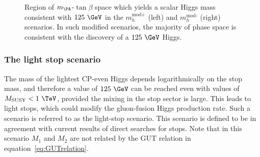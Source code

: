 \begin{figure}[htbp]
\caption{Region of $m_{\PA}$-$\tan\beta$ space which yields a scalar Higgs mass 
consistent with $125~\GeV$ in the $m_{h}^{\text{mod+}}$ (left) and
$m_{h}^{\text{mod-}}$ (right) scenarios. In such modified scenarios, the
majority of phase space is consistent with the discovery of a $125~\GeV$ Higgs.}
\label{fig:mhmodmass}
\end{figure}

\subsubsection{The light stop scenario}
\label{sec:lightstopscenario}

The mass of the lightest CP-even Higgs depends logarithmically on the stop mass,
and therefore a value of $125~\GeV$ can be reached even with values of
$M_{\text{SUSY}} < 1~\TeV$, provided the mixing in the stop sector is large. This
leads to light stops, which could modify the gluon-fusion Higgs production rate.
Such a scenario is referred to as the light-stop scenario. This scenario is
defined to be in agreement with current results of direct searches for stops.
Note that in this scenario $M_{1}$ and $M_{2}$ are not related by the GUT
relation in equation~\ref{eq:GUTrelation}. 

